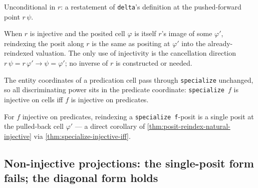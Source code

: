 \begin{proposition}\label{thm:delta-reindex-point}\leanok{}
Unconditional in \(r\): a restatement of \texttt{delta}'s definition at the
pushed-forward point \(r\,\psi\).
\end{proposition}

\begin{theorem}\label{thm:posit-reindex-natural-injective}\leanok{}
When \(r\) is injective and the posited cell \(\varphi\) is itself \(r\)'s
image of some \(\varphi'\), reindexing the posit along \(r\) is the same as
positing at \(\varphi'\) into the already-reindexed valuation. The only use
of injectivity is the cancellation direction \(r\,\psi = r\,\varphi' \to \psi
= \varphi'\); no inverse of \(r\) is constructed or needed.
\end{theorem}

\begin{proposition}\label{thm:specialize-injective-iff}\leanok{}
The entity coordinates of a predication cell pass through
\texttt{specialize} unchanged, so all discriminating power sits in the
predicate coordinate: \texttt{specialize}~\(f\) is injective on cells iff
\(f\) is injective on predicates.
\end{proposition}

\begin{theorem}\label{thm:posit-reindex-specialize-injective}\leanok{}
For \(f\) injective on predicates, reindexing a \texttt{specialize f}-posit
is a single posit at the pulled-back cell \(\varphi'\) --- a direct corollary
of \cref{thm:posit-reindex-natural-injective} via
\cref{thm:specialize-injective-iff}.
\end{theorem}

\subsection*{Non-injective projections: the single-posit form fails; the diagonal form holds}

